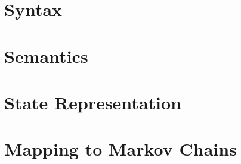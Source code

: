 \section{Syntax}
\section{Semantics}
\section{State Representation}
\section{Mapping to Markov Chains}

